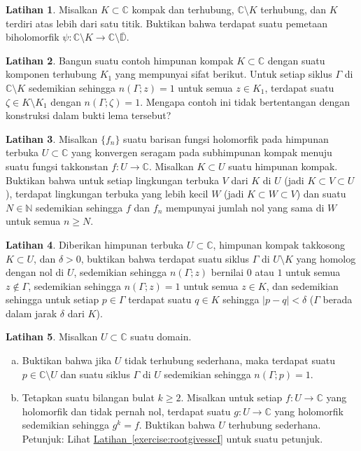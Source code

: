 \documentclass[12pt,openany]{book}
\newcommand{\sabs}[1]{\lvert {#1} \rvert}
\newcommand{\C}{{\mathbb{C}}}
\newcommand{\N}{{\mathbb{N}}}
\newcommand{\D}{{\mathbb{D}}}
\theoremstyle{plain}
\theoremstyle{remark}
\theoremstyle{definition}
\newenvironment{exbox}{%
    \def\FrameCommand{\vrule width 1pt \relax\hspace{10pt}}%
    \MakeFramed{\advance\hsize-\width\FrameRestore}%
}{%
    \endMakeFramed
}
\newenvironment{exparts}{%
    \leavevmode\begin{enumerate}[a),noitemsep,topsep=0pt,parsep=0pt,partopsep=0pt]
}{%
    \end{enumerate}
}
\theoremstyle{exercise}
\newtheorem{exercise}{Latihan}[section]
\theoremstyle{example}
\newcommand{\exerciseref}[1]{\hyperref[#1]{Latihan~\ref*{#1}}}
\begin{document}
\begin{exbox}
\begin{exercise}
Misalkan $K \subset \C$ kompak dan terhubung, $\C \setminus K$
terhubung, dan $K$ terdiri atas lebih dari satu titik.
Buktikan bahwa terdapat suatu pemetaan biholomorfik
$\psi \colon \C \setminus K \to \C \setminus \overline{\D}$.
\end{exercise}

\begin{exercise}
Bangun suatu contoh himpunan kompak $K \subset \C$ dengan suatu komponen terhubung $K_1$
yang mempunyai sifat berikut.
Untuk setiap siklus $\Gamma$ di $\C \setminus K$ sedemikian sehingga $n(\Gamma;z)=1$ untuk
semua $z \in K_1$,
terdapat suatu $\zeta \in K \setminus K_1$ dengan $n(\Gamma;\zeta)=1$.
Mengapa contoh ini tidak bertentangan dengan konstruksi dalam bukti lema tersebut?
\end{exercise}

\begin{exercise}
Misalkan $\{ f_n \}$ suatu barisan fungsi holomorfik pada himpunan terbuka
$U \subset \C$ yang konvergen seragam pada subhimpunan kompak menuju suatu fungsi takkonstan
$f \colon U \to \C$. Misalkan $K \subset U$ suatu himpunan kompak. Buktikan bahwa
untuk setiap lingkungan terbuka $V$ dari $K$ di $U$ (jadi $K \subset V \subset U$), terdapat
lingkungan terbuka yang lebih kecil $W$ (jadi $K \subset W \subset V$) dan suatu $N \in \N$
sedemikian sehingga $f$ dan $f_n$ mempunyai jumlah nol yang sama di $W$ untuk semua
$n \geq N$.
\end{exercise}

\begin{exercise}
Diberikan himpunan terbuka $U \subset \C$, himpunan kompak takkosong $K \subset U$, dan $\delta > 0$,
buktikan bahwa
terdapat suatu siklus $\Gamma$ di $U \setminus K$ yang homolog dengan nol di $U$,
sedemikian sehingga $n(\Gamma;z)$ bernilai $0$ atau $1$ untuk semua $z \notin \Gamma$,
sedemikian sehingga
$n(\Gamma;z) = 1$ untuk semua $z \in K$,
dan sedemikian sehingga untuk setiap $p \in \Gamma$ terdapat suatu $q \in K$ sehingga
$\sabs{p-q} < \delta$ ($\Gamma$ berada dalam jarak $\delta$ dari $K$).
\end{exercise}

\begin{exercise}\label{exercise:rootgivesscII}
Misalkan $U \subset \C$ suatu domain.
\begin{exparts}
\item
Buktikan bahwa jika $U$ tidak terhubung sederhana, maka terdapat suatu $p \in \C
\setminus U$ dan suatu siklus $\Gamma$ di $U$ sedemikian sehingga $n(\Gamma;p)=1$.
\item
Tetapkan suatu bilangan bulat $k \geq 2$.
Misalkan untuk setiap $f \colon U \to \C$ yang holomorfik dan tidak pernah nol,
terdapat suatu $g \colon U \to \C$ yang holomorfik sedemikian sehingga $g^k = f$.
Buktikan bahwa $U$ terhubung sederhana.
Petunjuk: Lihat \exerciseref{exercise:rootgivesscI} untuk suatu petunjuk.
\end{exparts}
\end{exercise}
\end{exbox}
\end{document}
